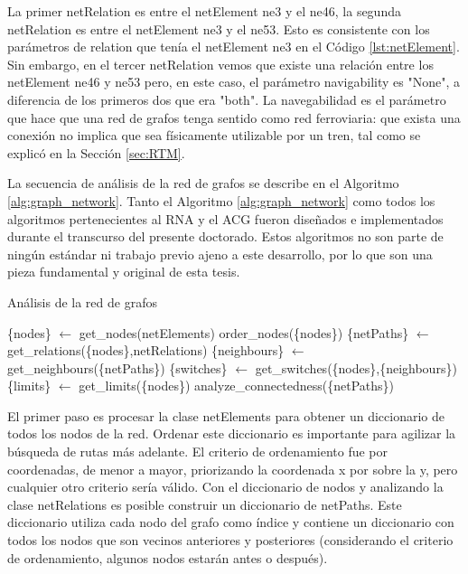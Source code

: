     La primer netRelation es entre el netElement ne3 y el ne46, la segunda netRelation es entre el netElement ne3 y el ne53. Esto es consistente con los parámetros de relation que tenía el netElement ne3 en el Código \ref{lst:netElement}. Sin embargo, en el tercer netRelation vemos que existe una relación entre los netElement ne46 y ne53 pero, en este caso, el parámetro navigability es "None", a diferencia de los primeros dos que era "both". La navegabilidad es el parámetro que hace que una red de grafos tenga sentido como red ferroviaria: que exista una conexión no implica que sea físicamente utilizable por un tren, tal como se explicó en la Sección \ref{sec:RTM}.
    
    La secuencia de análisis de la red de grafos se describe en el Algoritmo \ref{alg:graph_network}. Tanto el Algoritmo \ref{alg:graph_network} como todos los algoritmos pertenecientes al RNA y el ACG fueron diseñados e implementados durante el transcurso del presente doctorado. Estos algoritmos no son parte de ningún estándar ni trabajo previo ajeno a este desarrollo, por lo que son una pieza fundamental y original de esta tesis.    
    
    \begin{algorithm}[H]
    	\caption{Análisis de la red de grafos}
    	\label{alg:graph_network}
    	\begin{algorithmic}
    		\STATE \{nodes\} $\gets$ get\_nodes(netElements)
    		\STATE  order\_nodes(\{nodes\})
    		\STATE \{netPaths\} $\gets$ get\_relations(\{nodes\},netRelations)
    		\STATE \{neighbours\} $\gets$ get\_neighbours(\{netPaths\})
    		\STATE \{switches\} $\gets$ get\_switches(\{nodes\},\{neighbours\})
    		\STATE \{limits\} $\gets$ get\_limits(\{nodes\})
    		\STATE analyze\_connectedness(\{netPaths\})
    	\end{algorithmic}
    \end{algorithm}
    
    El primer paso es procesar la clase netElements para obtener un diccionario de todos los nodos de la red. Ordenar este diccionario es importante para agilizar la búsqueda de rutas más adelante. El criterio de ordenamiento fue por coordenadas, de menor a mayor, priorizando la coordenada x por sobre la y, pero cualquier otro criterio sería válido. Con el diccionario de nodos y analizando la clase netRelations es posible construir un diccionario de netPaths. Este diccionario utiliza cada nodo del grafo como índice y contiene un diccionario con todos los nodos que son vecinos anteriores y posteriores (considerando el criterio de ordenamiento, algunos nodos estarán antes o después).

